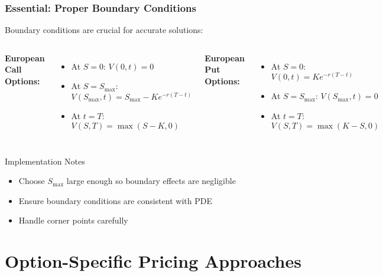 \documentclass{beamer}
\begin{document}
\begin{frame}
\frametitle{Essential: Proper Boundary Conditions}
Boundary conditions are crucial for accurate solutions:

\begin{columns}
\textbf{European Call Options:}
\begin{itemize}
\item At \(S = 0\): \(V(0,t) = 0\)
\item At \(S = S_{\max}\): \\
\(V(S_{\max},t) = S_{\max} - Ke^{-r(T-t)}\)
\item At \(t = T\): \\
\(V(S,T) = \max(S-K, 0)\)
\end{itemize}

\textbf{European Put Options:}
\begin{itemize}
\item At \(S = 0\): \(V(0,t) = Ke^{-r(T-t)}\)
\item At \(S = S_{\max}\): \(V(S_{\max},t) = 0\)
\item At \(t = T\): \\
\(V(S,T) = \max(K-S, 0)\)
\end{itemize}
\end{columns}

\begin{block}{Implementation Notes}
\begin{itemize}
\item Choose \(S_{\max}\) large enough so boundary effects are negligible
\item Ensure boundary conditions are consistent with PDE
\item Handle corner points carefully
\end{itemize}
\end{block}
\end{frame}

\section{Option-Specific Pricing Approaches}
\end{document}
